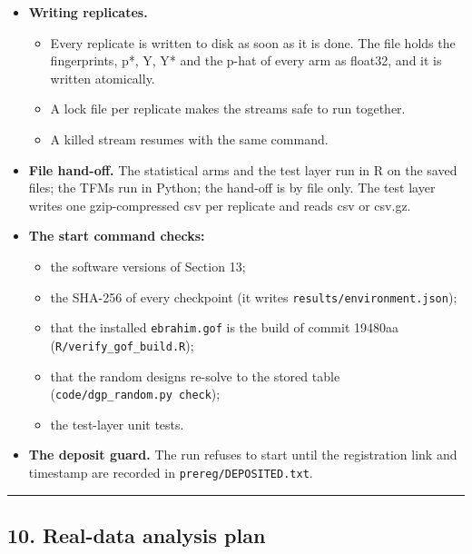 \documentclass[
  10pt,
]{article}
\providecommand{\tightlist}{%
  \setlength{\itemsep}{0pt}\setlength{\parskip}{0pt}}
\begin{document}
\begin{itemize}
\tightlist
\item
  \textbf{Writing replicates.}

  \begin{itemize}
  \tightlist
  \item
    Every replicate is written to disk as soon as it is
    done. The file holds the fingerprints, p*, Y, Y* and the
    p-hat of every arm as float32, and it is written
    atomically.
  \item
    A lock file per replicate makes the streams safe to run
    together.
  \item
    A killed stream resumes with the same command.
  \end{itemize}
\item
  \textbf{File hand-off.} The statistical arms and the test
  layer run in R on the saved files; the TFMs run in Python;
  the hand-off is by file only. The test layer writes one
  gzip-compressed csv per replicate and reads csv or csv.gz.
\item
  \textbf{The start command checks:}

  \begin{itemize}
  \tightlist
  \item
    the software versions of Section 13;
  \item
    the SHA-256 of every checkpoint (it writes
    \texttt{results/environment.json});
  \item
    that the installed \texttt{ebrahim.gof} is the build of
    commit 19480aa (\texttt{R/verify\_gof\_build.R});
  \item
    that the random designs re-solve to the stored table
    (\texttt{code/dgp\_random.py\ check});
  \item
    the test-layer unit tests.
  \end{itemize}
\item
  \textbf{The deposit guard.} The run refuses to start until
  the registration link and timestamp are recorded in
  \texttt{prereg/DEPOSITED.txt}.
\end{itemize}

\begin{center}\rule{0.5\linewidth}{0.5pt}\end{center}

\subsection{10. Real-data analysis
plan}\label{real-data-analysis-plan}
\end{document}
